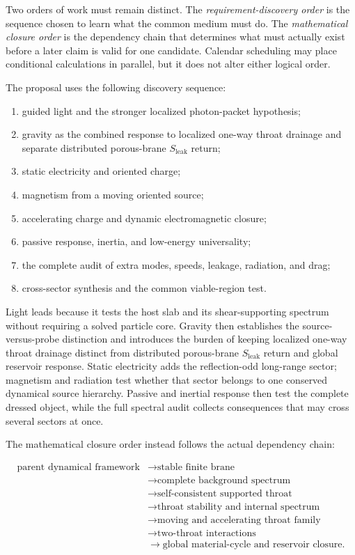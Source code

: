 Two orders of work must remain distinct. The \emph{requirement-discovery order}
is the sequence chosen to learn what the common medium must do. The
\emph{mathematical closure order} is the dependency chain that determines what
must actually exist before a later claim is valid for one candidate. Calendar
scheduling may place conditional calculations in parallel, but it does not
alter either logical order.

The proposal uses the following discovery sequence:

\begin{enumerate}[leftmargin=2.2em,itemsep=0.35em]
  \item guided light and the stronger localized photon-packet hypothesis;
  \item gravity as the combined response to localized one-way throat drainage
        and separate distributed porous-brane \(S_{\mathrm{leak}}\) return;
  \item static electricity and oriented charge;
  \item magnetism from a moving oriented source;
  \item accelerating charge and dynamic electromagnetic closure;
  \item passive response, inertia, and low-energy universality;
  \item the complete audit of extra modes, speeds, leakage, radiation, and drag;
  \item cross-sector synthesis and the common viable-region test.
\end{enumerate}

Light leads because it tests the host slab and its shear-supporting spectrum
without requiring a solved particle core. Gravity then establishes the
source-versus-probe distinction and introduces the burden of keeping localized
one-way throat drainage distinct from distributed porous-brane
\(S_{\mathrm{leak}}\) return and global reservoir response.
Static electricity adds the reflection-odd long-range sector; magnetism and
radiation test whether that sector belongs to one conserved dynamical source
hierarchy. Passive and inertial response then test the complete dressed object,
while the full spectral audit collects consequences that may cross several
sectors at once.

The mathematical closure order instead follows the actual dependency chain:

\[
\boxed{
\begin{aligned}
\text{parent dynamical framework}
&\longrightarrow \text{stable finite brane}\\
&\longrightarrow \text{complete background spectrum}\\
&\longrightarrow \text{self-consistent supported throat}\\
&\longrightarrow \text{throat stability and internal spectrum}\\
&\longrightarrow \text{moving and accelerating throat family}\\
&\longrightarrow \text{two-throat interactions}\\
&\longrightarrow \text{global material-cycle and reservoir closure}.
\end{aligned}
}
\]

